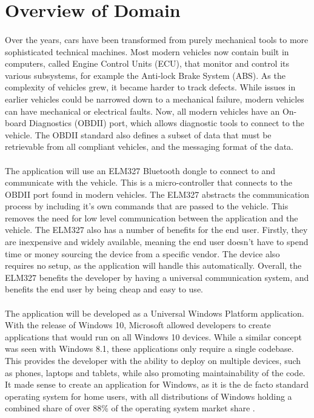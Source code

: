 \section{Overview of Domain}
	\paragraph{}{
	Over the years, cars have been transformed from purely mechanical tools to more sophisticated technical machines. Most modern vehicles now contain built in computers, called Engine Control Units (ECU), that monitor and control its various subsystems, for example the Anti-lock Brake System (ABS). As the complexity of vehicles grew, it became harder to track defects. While issues in earlier vehicles could be narrowed down to a mechanical failure, modern vehicles can have mechanical or electrical faults. Now, all modern vehicles have an On-board Diagnostics (OBDII) port, which allows diagnostic tools to connect to the vehicle. The OBDII standard also defines a subset of data that must be retrievable from all compliant vehicles, and the messaging format of the data.		 
	}
	\paragraph{}{
	The application will use an ELM327 Bluetooth dongle to connect to and communicate with the vehicle. This is a micro-controller that connects to the OBDII port found in modern vehicles. The ELM327 abstracts the communication process by including it's own commands that are passed to the vehicle. This removes the need for low level communication between the application and the vehicle. The ELM327 also has a number of benefits for the end user. Firstly, they are inexpensive and widely available, meaning the end user doesn't have to spend time or money sourcing the device from a specific vendor. The device also requires no setup, as the application will handle this automatically. Overall, the ELM327 benefits the developer by having a universal communication system, and benefits the end user by being cheap and easy to use.
	}
	\paragraph{}{
	The application will be developed as a Universal Windows Platform application. With the release of Windows 10, Microsoft allowed developers to create applications that would run on all Windows 10 devices. While a similar concept was seen with Windows 8.1, these applications only require a single codebase. This provides the developer with the ability to deploy on multiple devices, such as phones, laptops and tablets, while also promoting maintainability of the code. It made sense to create an application for Windows, as it is the de facto standard operating system for home users, with all distributions of Windows holding a combined share of over 88{\%} of the operating system market share \citep{OSMarketShare}.
	}
